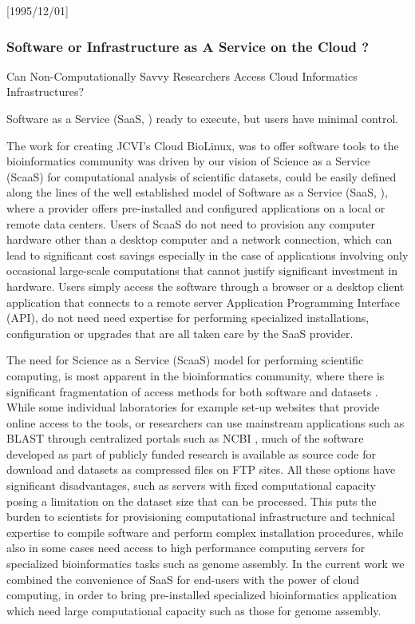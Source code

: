 \NeedsTeXFormat{LaTeX2e}[1995/12/01] \documentclass[10pt]{bmc_article}
\newenvironment{bmcformat}{\begin{raggedright}\baselineskip20pt\sloppy\setboolean{publ}{false}}{\end{raggedright}\baselineskip20pt\sloppy}
\begin{document}
\begin{bmcformat}
\subsubsection*{Software or Infrastructure as A Service on the Cloud ?}

Can Non-Computationally Savvy Researchers Access Cloud Informatics Infrastructures? 


Software as a Service (SaaS, \cite{papazoglou2003}) ready to execute, but users have minimal control.

The work for creating JCVI's Cloud BioLinux, was to offer software tools to the bioinformatics community was 
driven by our vision of  Science as a Service (ScaaS) for computational analysis of scientific datasets, could be easily 
defined along the lines of the well established model of Software as a Service (SaaS, \cite{papazoglou2003}), 
where a provider offers pre-installed and configured applications on a local or remote data centers. Users of 
ScaaS do not need to provision any computer hardware other than a desktop computer and a network connection, 
which can lead to significant cost savings especially in the case of applications involving only occasional 
large-scale computations that cannot justify significant investment in hardware. Users simply access the 
software through a browser or a desktop client application that connects to a remote server Application 
Programming Interface (API), do not need need expertise for performing specialized installations, configuration 
or upgrades that are all taken care by the SaaS provider.  

The need for Science as a Service (ScaaS) model for performing scientific computing, is most apparent in the 
bioinformatics community, where there is significant fragmentation of access methods for both software and datasets 
\cite{stein}. While some individual laboratories for example set-up websites that provide online access to the 
tools, or researchers can use mainstream applications such as BLAST \cite{altchul} through centralized portals
such as NCBI \cite{}, much of the software developed as part of publicly funded research is available as source 
code for download and datasets as compressed files on FTP sites. All these options have significant disadvantages,  
such as servers with fixed computational capacity posing a limitation on the dataset size that can be processed. 
This puts the burden to scientists for provisioning computational infrastructure and technical expertise to compile
software and perform complex installation procedures, while also in some cases need access to high performance computing 
servers for specialized bioinformatics tasks such as genome assembly. In the current work we combined the convenience 
of SaaS for end-users with the power of cloud computing, in order to bring pre-installed specialized bioinformatics application 
which need large computational capacity such as those for genome assembly.



\end{bmcformat}
\end{document}
